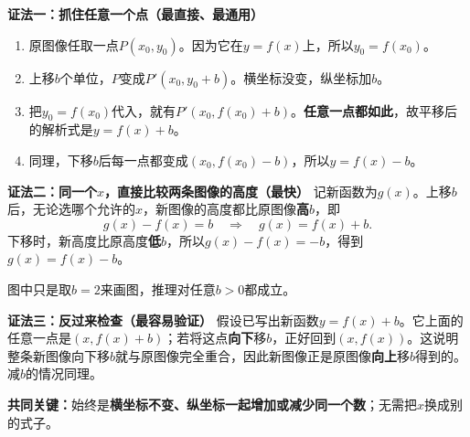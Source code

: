 \begin{proofbox}
  \textbf{\textcolor{CProof}{证法一：抓住任意一个点（最直接、最通用）}}
  \begin{enumerate}[leftmargin=*,itemsep=0.3em,topsep=0.2em]
    \item 原图像任取一点$P(x_0,y_0)$。因为它在$y=f(x)$上，所以$y_0=f(x_0)$。
    \item 上移$b$个单位，$P$变成$P'(x_0,y_0+b)$。横坐标没变，纵坐标加$b$。
    \item 把$y_0=f(x_0)$代入，就有$P'(x_0,f(x_0)+b)$。\textbf{任意一点都如此}，故平移后的解析式是$y=f(x)+b$。
    \item 同理，下移$b$后每一点都变成$(x_0,f(x_0)-b)$，所以$y=f(x)-b$。
  \end{enumerate}
  \begin{center}
  
  \end{center}

  \medskip
  \textbf{\textcolor{CProof}{证法二：同一个$x$，直接比较两条图像的高度（最快）}}
  记新函数为$g(x)$。上移$b$后，无论选哪个允许的$x$，新图像的高度都比原图像\textbf{高$b$}，即
  \[
    g(x)-f(x)=b\quad\Longrightarrow\quad g(x)=f(x)+b.
  \]
  下移时，新高度比原高度\textbf{低$b$}，所以$g(x)-f(x)=-b$，得到$g(x)=f(x)-b$。
  \begin{center}
  
  \end{center}
  图中只是取$b=2$来画图，推理对任意$b>0$都成立。

  \medskip
  \textbf{\textcolor{CProof}{证法三：反过来检查（最容易验证）}}
  假设已写出新函数$y=f(x)+b$。它上面的任意一点是$(x,f(x)+b)$；若将这点\textbf{向下}移$b$，正好回到$(x,f(x))$。这说明整条新图像向下移$b$就与原图像完全重合，因此新图像正是原图像\textbf{向上}移$b$得到的。减$b$的情况同理。
  \begin{center}
  
  \end{center}
  \textbf{共同关键：}始终是\textbf{横坐标不变、纵坐标一起增加或减少同一个数}；无需把$x$换成别的式子。
\end{proofbox}
